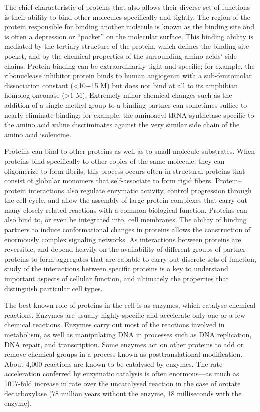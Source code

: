 The chief characteristic of proteins that also allows their diverse set
of functions is their ability to bind other molecules specifically and
tightly. The region of the protein responsible for binding another
molecule is known as the binding site and is often a depression or
``pocket'' on the molecular surface. This binding ability is mediated by
the tertiary structure of the protein, which defines the binding site
pocket, and by the chemical properties of the surrounding amino acids'
side chains. Protein binding can be extraordinarily tight and specific;
for example, the ribonuclease inhibitor protein binds to human
angiogenin with a sub-femtomolar dissociation constant (\textless10−15
M) but does not bind at all to its amphibian homolog onconase
(\textgreater1 M). Extremely minor chemical changes such as the addition
of a single methyl group to a binding partner can sometimes suffice to
nearly eliminate binding; for example, the aminoacyl tRNA synthetase
specific to the amino acid valine discriminates against the very similar
side chain of the amino acid isoleucine.

Proteins can bind to other proteins as well as to small-molecule
substrates. When proteins bind specifically to other copies of the same
molecule, they can oligomerize to form fibrils; this process occurs
often in structural proteins that consist of globular monomers that
self-associate to form rigid fibers. Protein--protein interactions also
regulate enzymatic activity, control progression through the cell cycle,
and allow the assembly of large protein complexes that carry out many
closely related reactions with a common biological function. Proteins
can also bind to, or even be integrated into, cell membranes. The
ability of binding partners to induce conformational changes in proteins
allows the construction of enormously complex signaling networks. As
interactions between proteins are reversible, and depend heavily on the
availability of different groups of partner proteins to form aggregates
that are capable to carry out discrete sets of function, study of the
interactions between specific proteins is a key to understand important
aspects of cellular function, and ultimately the properties that
distinguish particular cell types.

The best-known role of proteins in the cell is as enzymes, which
catalyse chemical reactions. Enzymes are usually highly specific and
accelerate only one or a few chemical reactions. Enzymes carry out most
of the reactions involved in metabolism, as well as manipulating DNA in
processes such as DNA replication, DNA repair, and transcription. Some
enzymes act on other proteins to add or remove chemical groups in a
process known as posttranslational modification. About 4,000 reactions
are known to be catalysed by enzymes. The rate acceleration conferred by
enzymatic catalysis is often enormous---as much as 1017-fold increase in
rate over the uncatalysed reaction in the case of orotate decarboxylase
(78 million years without the enzyme, 18 milliseconds with the enzyme).

